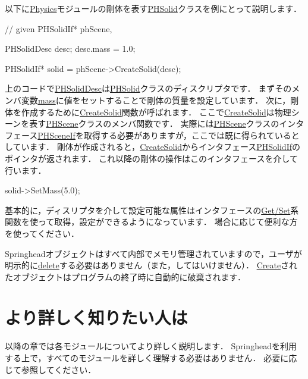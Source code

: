 \KLUDGE 以下に\url{Physics}モジュールの剛体を表す\url{PHSolid}クラスを例にとって説明します．
\begin{sourcecode}
// given PHSolidIf* phScene, 

PHSolidDesc desc;
desc.mass = 1.0;

PHSolidIf* solid = phScene->CreateSolid(desc);
\end{sourcecode}
\KLUDGE 上のコードで\url{PHSolidDesc}は\url{PHSolid}クラスのディスクリプタです．
\KLUDGE まずそのメンバ変数\url{mass}に値をセットすることで剛体の質量を設定しています．
\KLUDGE 次に，剛体を作成するために\url{CreateSolid}関数が呼ばれます．
\KLUDGE ここで\url{CreateSolid}は物理シーンを表す\url{PHScene}クラスのメンバ関数です．
\KLUDGE 実際には\url{PHScene}クラスのインタフェース\url{PHSceneIf}を取得する必要がありますが，ここでは既に得られているとしています．
\KLUDGE 剛体が作成されると，\url{CreateSolid}からインタフェース\url{PHSolidIf}のポインタが返されます．
\KLUDGE これ以降の剛体の操作はこのインタフェースを介して行います．
\begin{sourcecode}
solid->SetMass(5.0);
\end{sourcecode}
\KLUDGE 基本的に，ディスリプタを介して設定可能な属性はインタフェースの\url{Get/Set}系関数を使って取得，設定ができるようになっています．
\KLUDGE 場合に応じて便利な方を使ってください．

Springheadオブジェクトはすべて内部でメモリ管理されていますので，ユーザが明示的に\url{delete}する必要はありません（また，してはいけません）．
\url{Create}されたオブジェクトはプログラムの終了時に自動的に破棄されます．

\section*{より詳しく知りたい人は}

\KLUDGE 以降の章では各モジュールについてより詳しく説明します．
Springheadを利用する上で，すべてのモジュールを詳しく理解する必要はありません．
\KLUDGE 必要に応じて参照してください．
